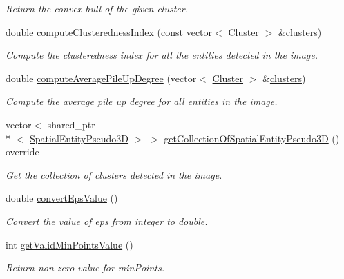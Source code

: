 \begin{DoxyCompactItemize}
\begin{DoxyCompactList}\small\item\em Return the convex hull of the given cluster. \end{DoxyCompactList}\item 
double \hyperlink{classmultiscale_1_1analysis_1_1ClusterDetector_aaa7937daf9872614e09b23cb4f6e5aa8}{compute\-Clusteredness\-Index} (const vector$<$ \hyperlink{classmultiscale_1_1analysis_1_1Cluster}{Cluster} $>$ \&\hyperlink{classmultiscale_1_1analysis_1_1ClusterDetector_aa81a8649bc743389c2fc1919d47eb5b3}{clusters})
\begin{DoxyCompactList}\small\item\em Compute the clusteredness index for all the entities detected in the image. \end{DoxyCompactList}\item 
double \hyperlink{classmultiscale_1_1analysis_1_1ClusterDetector_a1efab8446c79feb8a9285d895bb64b05}{compute\-Average\-Pile\-Up\-Degree} (vector$<$ \hyperlink{classmultiscale_1_1analysis_1_1Cluster}{Cluster} $>$ \&\hyperlink{classmultiscale_1_1analysis_1_1ClusterDetector_aa81a8649bc743389c2fc1919d47eb5b3}{clusters})
\begin{DoxyCompactList}\small\item\em Compute the average pile up degree for all entities in the image. \end{DoxyCompactList}\item 
vector$<$ shared\-\_\-ptr\\*
$<$ \hyperlink{classmultiscale_1_1analysis_1_1SpatialEntityPseudo3D}{Spatial\-Entity\-Pseudo3\-D} $>$ $>$ \hyperlink{classmultiscale_1_1analysis_1_1ClusterDetector_a6bf0ac91b81cdcf46fe8e50f6dd4c9a8}{get\-Collection\-Of\-Spatial\-Entity\-Pseudo3\-D} () override
\begin{DoxyCompactList}\small\item\em Get the collection of clusters detected in the image. \end{DoxyCompactList}\item 
double \hyperlink{classmultiscale_1_1analysis_1_1ClusterDetector_afccb86bfb93df00fff8408faea7a2651}{convert\-Eps\-Value} ()
\begin{DoxyCompactList}\small\item\em Convert the value of eps from integer to double. \end{DoxyCompactList}\item 
int \hyperlink{classmultiscale_1_1analysis_1_1ClusterDetector_ab1c2514fb8599f74bf010e81154a9bf7}{get\-Valid\-Min\-Points\-Value} ()
\begin{DoxyCompactList}\small\item\em Return non-\/zero value for min\-Points. \end{DoxyCompactList}\end{DoxyCompactItemize}
